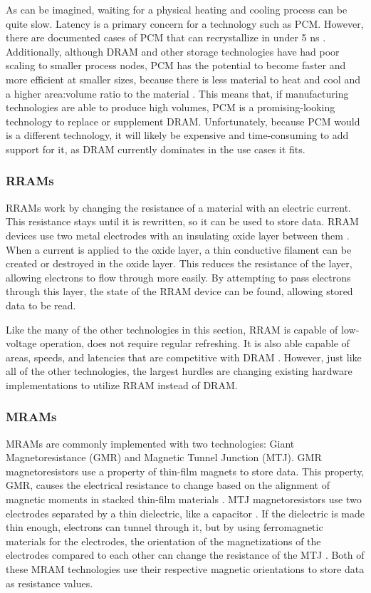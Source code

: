 \documentclass[doublespace,nopageskip]{VTthesis}
\begin{document}
As can be imagined, waiting for a physical heating and cooling process can be quite slow. Latency is a primary concern for a technology such as PCM. However, there are documented cases of PCM that can recrystallize in under 5 ns \cite{fastswitchingpcm}. Additionally, although DRAM and other storage technologies have had poor scaling to smaller process nodes, PCM has the potential to become faster and more efficient at smaller sizes, because there is less material to heat and cool and a higher area:volume ratio to the material \cite{fastswitchingpcm}. This means that, if manufacturing technologies are able to produce high volumes, PCM is a promising-looking technology to replace or supplement DRAM. Unfortunately, because PCM would is a different technology, it will likely be expensive and time-consuming to add support for it, as DRAM currently dominates in the use cases it fits.

\subsubsection{RRAMs}\label{sss:rrams}
RRAMs work by changing the resistance of a material with an electric current. This resistance stays until it is rewritten, so it can be used to store data. RRAM devices use two metal electrodes with an insulating oxide layer between them \cite{rramoverview}. When a current is applied to the oxide layer, a thin conductive filament can be created or destroyed in the oxide layer. This reduces the resistance of the layer, allowing electrons to flow through more easily. By attempting to pass electrons through this layer, the state of the RRAM device can be found, allowing stored data to be read.

Like the many of the other technologies in this section, RRAM is capable of low-voltage operation, does not require regular refreshing. It is also able capable of areas, speeds, and latencies that are competitive with DRAM \cite{rram}. However, just like all of the other technologies, the largest hurdles are changing existing hardware implementations to utilize RRAM instead of DRAM.

\subsubsection{MRAMs}\label{sss:mrams}
MRAMs are commonly implemented with two technologies: Giant Magnetoresistance (GMR) and Magnetic Tunnel Junction (MTJ). GMR magnetoresistors use a property of thin-film magnets to store data. This property, GMR, causes the electrical resistance to change based on the alignment of magnetic moments in stacked thin-film materials \cite{gmrphysics}. MTJ magnetoresistors use two electrodes separated by a thin dielectric, like a capacitor \cite{gmrphysics}. If the dielectric is made thin enough, electrons can tunnel through it, but by using ferromagnetic materials for the electrodes, the orientation of the magnetizations of the electrodes compared to each other can change the resistance of the MTJ \cite{gmrphysics}. Both of these MRAM technologies use their respective magnetic orientations to store data as resistance values.
\end{document}
